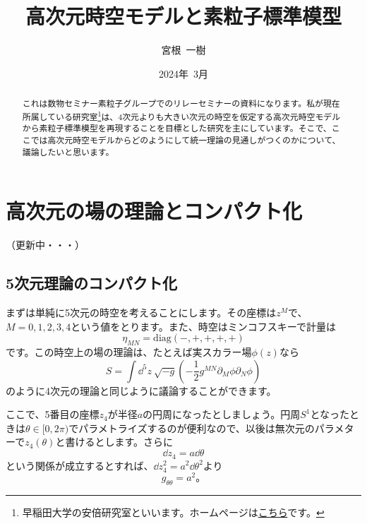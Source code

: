 \documentclass[unicode,a4paper,11pt]{ltjsarticle}
\title{高次元時空モデルと素粒子標準模型}
\author{宮根\ 一樹}
\date{2024年\ 3月}
\begin{document}
\maketitle

\begin{abstract}
   これは数物セミナー素粒子グループでのリレーセミナーの資料になります。私が現在所属している研究室\footnote{
      早稲田大学の安倍研究室といいます。ホームページは\href{http://www.hep.phys.waseda.ac.jp/index-j.html}{こちら}です。
   }は、4次元よりも大きい次元の時空を仮定する高次元時空モデルから素粒子標準模型を再現することを目標とした研究を主にしています。そこで、ここでは高次元時空モデルからどのようにして統一理論の見通しがつくのかについて、議論したいと思います。
\end{abstract}

\tableofcontents

\clearpage

\section{高次元の場の理論とコンパクト化}

（更新中・・・）


\subsection{5次元理論のコンパクト化}

まずは単純に5次元の時空を考えることにします。その座標は$z^{M}$で、$M=0,1,2,3,4$という値をとります。また、時空はミンコフスキーで計量は
\begin{equation}
   \eta_{MN}
   =
   \mathrm{diag}(-,+,+,+,+)
\end{equation}
です。この時空上の場の理論は、たとえば実スカラー場$\phi(z)$なら
\begin{equation}
   S
   =
   \int\dd^5 z\ \sqrt{-g}
   \left(
   -\frac{1}{2}
   g^{MN}\partial_{M}\phi\partial_{N}\phi
   \right)
   \label{eqn:action_5d_real_scalar}
\end{equation}
のように4次元の理論と同じように議論することができます。

ここで、5番目の座標$z_{4}$が半径$a$の円周になったとしましょう。円周$S^{1}$となったときは$\theta\in[0,2\pi)$でパラメトライズするのが便利なので、以後は無次元のパラメターで$z_{4}(\theta)$と書けるとします。さらに
\begin{equation}
   \dd z_{4}
   =
   a\dd \theta
\end{equation}
という関係が成立するとすれば、$\dd z_{4}^2=a^2\dd \theta^2$より
\begin{equation}
   g_{\theta\theta}=a^2
   。
\end{equation}
\end{document}
